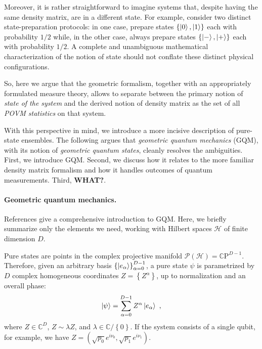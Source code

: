 \documentclass[draft,nofootinbib,prl,twocolumn,showpacs,showkeys,groupaddress,preprintnumbers,floatfix]{revtex4-1}
\newcommand{\1}{\mathbbm{1}}
\begin{document}

Moreover, it is rather straightforward to imagine systems that, despite
having the same density matrix, are in a different state. For example, consider
two distinct state-preparation protocols: in one case, prepare states
$\{\ket{0},\ket{1}\}$ each with probability $1/2$ while, in the other case,
always prepare states $\{\ket{-},\ket{+}\}$ each with probability $1/2$. A
complete and unambiguous mathematical characterization of the notion of 
state should not conflate these distinct physical configurations.

So, here we argue that the geometric formalism, together with an appropriately
formulated measure theory, allows to separate between the primary notion of 
\emph{state of the system} and the derived notion of density matrix as the set of 
all \emph{POVM statistics} on that system. 

With this perspective in mind, we introduce a more incisive description of
pure-state ensembles. The following argues that \emph{geometric quantum
mechanics} (GQM), with its notion of \emph{geometric quantum states}, cleanly
resolves the ambiguities. First, we introduce GQM. Second, we discuss how it
relates to the more familiar density matrix formalism and how it handles
outcomes of quantum measurements. Third, {\bf WHAT?}.

\paragraph*{Geometric quantum mechanics.}\label{sec:GQM}
References
\cite{STROCCHI1966,Kibble1979,Heslot1985,Gibbons1992,Ashtekar1995,Ashtekar1999,Brody2001,Bengtsson2017,Carinena2007,Chruscinski2006,Marmo2010,Avron2020,Pastorello2015,Pastorello2015a,Pastorello2016,Clemente-Gallardo2013}
give a comprehensive introduction to GQM. Here, we briefly summarize only the
elements we need, working with Hilbert spaces $\mathcal{H}$ of finite dimension $D$.

Pure states are points in the complex projective manifold $\mathcal{P}\left(
\mathcal{H} \right)=\mathbb{C}\mathrm{P}^{D-1}$. Therefore, given an arbitrary
basis $\left\{\ket{e_\alpha} \right\}_{\alpha=0}^{D-1}$, a pure state $\psi$ is
parametrized by $D$ complex homogeneous coordinates $Z = \left\{      Z^\alpha\right\}$, up to
normalization and an overall phase:
\begin{align*}
\ket{\psi} = \sum_{\alpha=0}^{D-1} Z^\alpha \ket{e_\alpha}
  ~,
\end{align*}
where $Z \in \mathbb{C}^{D}$, $Z \sim \lambda Z$, and $\lambda \in
\mathbb{C}/\left\{ 0\right\}$. If the system consists of a single qubit, for
example, we have $Z = (\sqrt{p_0}e^{i\nu_0},\sqrt{p_1} e^{i\nu_1})$.
\end{document}
